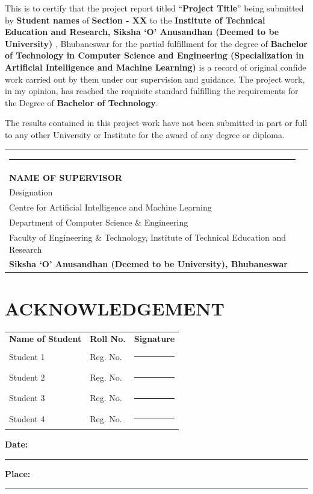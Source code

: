\documentclass[12pt,a4paper]{report}
\begin{document}
\noindent This is to certify that the project report titled “\textbf{Project Title}” being submitted by \textbf{Student names} of \textbf{Section - XX} to the \textbf{Institute of Technical Education and Research, Siksha ‘O’ Anusandhan (Deemed to be University) }, Bhubaneswar for the partial fulfillment for the degree of \textbf{Bachelor of Technology in Computer Science and Engineering (Specialization in Artificial Intelligence and Machine Learning)} is a record of original confide work carried out by them under our supervision and guidance. The project work, in my opinion, has reached the requisite standard fulfilling the requirements for the Degree of \textbf{Bachelor of Technology}. 

\noindent The results contained in this project work have not been submitted in part or full to any other University or Institute for the award of any degree or diploma.

\vfill{}

\noindent\begin{tabular}{p{15cm} p{0.0cm}}
\rule{6.2cm}{0.5pt} & \\
\textbf{NAME OF SUPERVISOR} &\\
Designation &\\
Centre for Artificial Intelligence and Machine Learning &\\
Department of Computer Science \& Engineering &\\
Faculty of Engineering \& Technology, Institute of Technical Education and Research &\\
\textbf{Siksha `O' Anusandhan (Deemed to be University),  Bhubaneswar}
&\\

\end{tabular}


\chapter*{ACKNOWLEDGEMENT}
\vfill
\begin{center}
\begin{tabular}{p{5.2cm}p{5.8cm}p{3.2cm}}
\textbf{Name of Student} & \textbf{Roll No.} & \textbf{Signature} \\[1em]
Student 1 & Reg. No.& \rule{3.2cm}{0.2pt} \\[1em]
Student 2 & Reg. No.& \rule{3.2cm}{0.2pt} \\[1em]
Student 3 & Reg. No.& \rule{3.2cm}{0.2pt} \\[1em]
Student 4 & Reg. No.& \rule{3.2cm}{0.2pt} \\[1em]
\end{tabular}
\end{center}
\vspace{1cm}
\noindent\textbf{Date:} \rule{5cm}{0.2pt} \hfill \textbf{Place:} \rule{5cm}{0.2pt}
\end{document}
